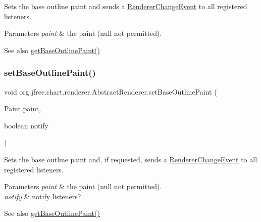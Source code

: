 Sets the base outline paint and sends a \mbox{\hyperlink{}{Renderer\+Change\+Event}} to all registered listeners.


\begin{DoxyParams}{Parameters}
{\em paint} & the paint ({\ttfamily null} not permitted).\\
\hline
\end{DoxyParams}
\begin{DoxySeeAlso}{See also}
\mbox{\hyperlink{classorg_1_1jfree_1_1chart_1_1renderer_1_1_abstract_renderer_a431b943b37813034936dff4c167deb30}{get\+Base\+Outline\+Paint()}} 
\end{DoxySeeAlso}
\mbox{\label{classorg_1_1jfree_1_1chart_1_1renderer_1_1_abstract_renderer_a3132fccedf5a5e1c07a003477aaf1109}} 
\subsubsection{\texorpdfstring{set\+Base\+Outline\+Paint()}{setBaseOutlinePaint()}\hspace{0.1cm}{\footnotesize\ttfamily [2/2]}}
{\footnotesize\ttfamily void org.\+jfree.\+chart.\+renderer.\+Abstract\+Renderer.\+set\+Base\+Outline\+Paint (\begin{DoxyParamCaption}\item[{Paint}]{paint,  }\item[{boolean}]{notify }\end{DoxyParamCaption})}

Sets the base outline paint and, if requested, sends a \mbox{\hyperlink{}{Renderer\+Change\+Event}} to all registered listeners.


\begin{DoxyParams}{Parameters}
{\em paint} & the paint ({\ttfamily null} not permitted). \\
\hline
{\em notify} & notify listeners?\\
\hline
\end{DoxyParams}
\begin{DoxySeeAlso}{See also}
\mbox{\hyperlink{classorg_1_1jfree_1_1chart_1_1renderer_1_1_abstract_renderer_a431b943b37813034936dff4c167deb30}{get\+Base\+Outline\+Paint()}} 
\end{DoxySeeAlso}
\mbox{\label{classorg_1_1jfree_1_1chart_1_1renderer_1_1_abstract_renderer_a8626e74d5ba48c73c39af03b289ea7a0}} 
